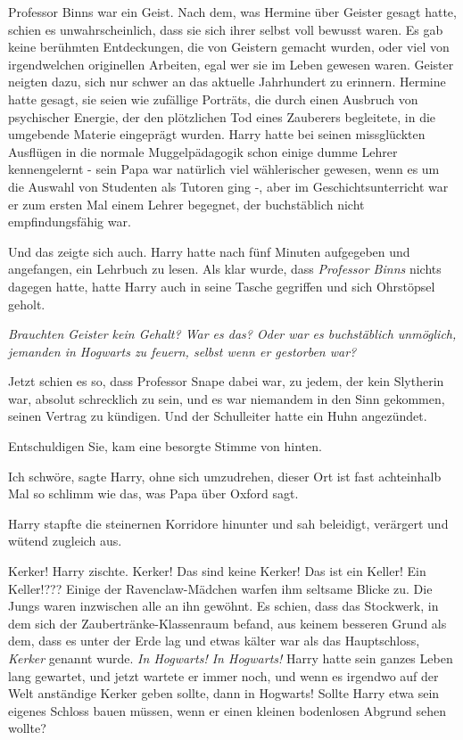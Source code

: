 Professor Binns war ein Geist. Nach dem, was Hermine über Geister gesagt hatte,
schien es unwahrscheinlich, dass sie sich ihrer selbst voll bewusst waren. Es
gab keine berühmten Entdeckungen, die von Geistern gemacht wurden, oder viel von
irgendwelchen originellen Arbeiten, egal wer sie im Leben gewesen waren. Geister
neigten dazu, sich nur schwer an das aktuelle Jahrhundert zu erinnern. Hermine
hatte gesagt, sie seien wie zufällige Porträts, die durch einen Ausbruch von
psychischer Energie, der den plötzlichen Tod eines Zauberers begleitete, in die
umgebende Materie eingeprägt wurden. Harry hatte bei seinen missglückten
Ausflügen in die normale Muggelpädagogik schon einige dumme Lehrer kennengelernt
- sein Papa war natürlich viel wählerischer gewesen, wenn es um die Auswahl von
Studenten als Tutoren ging -, aber im Geschichtsunterricht war er zum ersten Mal
einem Lehrer begegnet, der buchstäblich nicht empfindungsfähig war.

Und das zeigte sich auch. Harry hatte nach fünf Minuten aufgegeben und
angefangen, ein Lehrbuch zu lesen. Als klar wurde, dass \emph{\glqq{}Professor
Binns\grqq{}} nichts dagegen hatte, hatte Harry auch in seine Tasche gegriffen
und sich Ohrstöpsel geholt.

\emph{Brauchten Geister kein Gehalt? War es das? Oder war es buchstäblich
unmöglich, jemanden in Hogwarts zu feuern, selbst wenn er gestorben war?}

Jetzt schien es so, dass Professor Snape dabei war, zu jedem, der kein Slytherin
war, absolut schrecklich zu sein, und es war niemandem in den Sinn gekommen,
seinen Vertrag zu kündigen. Und der Schulleiter hatte ein Huhn angezündet.

\glqq{}Entschuldigen Sie\grqq{}, kam eine besorgte Stimme von hinten.

\glqq{}Ich schwöre\grqq{}, sagte Harry, ohne sich umzudrehen, \glqq{}dieser Ort
ist fast achteinhalb Mal so schlimm wie das, was Papa über Oxford sagt.\grqq{}

Harry stapfte die steinernen Korridore hinunter und sah beleidigt, verärgert und
wütend zugleich aus.

\glqq{}Kerker!\grqq{} Harry zischte. \glqq{}Kerker! Das sind keine Kerker! Das ist
ein Keller! Ein Keller!???\grqq{} Einige der Ravenclaw-Mädchen warfen ihm
seltsame Blicke zu. Die Jungs waren inzwischen alle an ihn gewöhnt. Es schien,
dass das Stockwerk, in dem sich der Zaubertränke-Klassenraum befand, aus keinem
besseren Grund als dem, dass es unter der Erde lag und etwas kälter war als das
Hauptschloss, \emph{\glqq{}Kerker\grqq{}} genannt wurde. \emph{In Hogwarts! In
Hogwarts!} Harry hatte sein ganzes Leben lang gewartet, und jetzt wartete er
immer noch, und wenn es irgendwo auf der Welt anständige Kerker geben sollte,
dann in Hogwarts! Sollte Harry etwa sein eigenes Schloss bauen müssen, wenn er
einen kleinen bodenlosen Abgrund sehen wollte?

